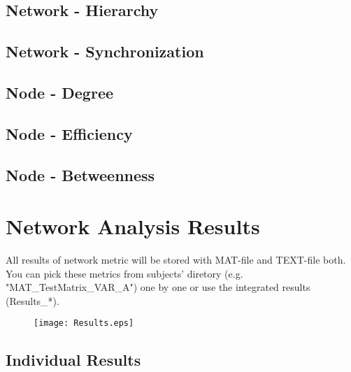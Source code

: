 \documentclass[11pt]{article}
\begin{document}
		\subsection{Network - Hierarchy}
		\subsection{Network - Synchronization}
		\subsection{Node - Degree}
		\subsection{Node - Efficiency}
		\subsection{Node - Betweenness}
	\section{Network Analysis Results}
		All results of network metric will be stored with MAT-file and TEXT-file both. 
		You can pick these metrics from subjects' diretory (e.g. "MAT\_TestMatrix\_VAR\_A") one by one or use the integrated results (Results\_*).
		\begin{figure}
			\begin{center}
				\texttt{[image: Results.eps]}
			\end{center}
		\end{figure}
		\subsection{Individual Results}
\end{document}

